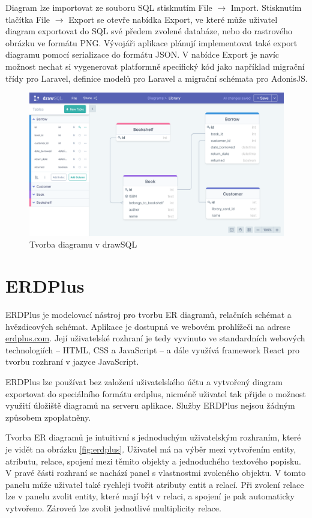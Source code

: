 Diagram lze importovat ze souboru SQL stisknutím File $\rightarrow$ Import.
Stisknutím tlačítka File $\rightarrow$ Export se otevře nabídka Export, ve které
může uživatel diagram exportovat do SQL své předem zvolené databáze, nebo do
rastrového obrázku ve formátu PNG. Vývojáři aplikace plánují implementovat také
export diagramu pomocí serializace do formátu JSON. V nabídce Export je navíc
možnost nechat si vygenerovat platformně specifický kód jako například migrační
třídy pro Laravel, definice modelů pro Laravel a migrační schémata pro AdonisJS.

\begin{figure}
  \centering
  \includegraphics[width=\textwidth]{../img/drawsql.png}
  \caption{Tvorba diagramu v drawSQL}
  \label{fig:drawsql}
\end{figure}

\section{ERDPlus}

ERDPlus je modelovací nástroj pro tvorbu ER diagramů, relačních schémat a
hvězdicových schémat. Aplikace je dostupná ve webovém prohlížeči na adrese
\url{erdplus.com}. Její uživatelské rozhraní je tedy vyvinuto ve standardních
webových technologiích -- HTML, CSS a JavaScript -- a dále využívá framework
React pro tvorbu rozhraní v jazyce JavaScript.

ERDPlus lze používat bez založení uživatelského účtu a vytvořený diagram
exportovat do speciálního formátu erdplus, nicméně uživatel tak přijde o možnost
využití úložiště diagramů na serveru aplikace. Služby ERDPlus nejsou žádným
způsobem zpoplatněny.

Tvorba ER diagramů je intuitivní s jednoduchým uživatelským rozhraním, které je
vidět na obrázku \ref{fig:erdplus}. Uživatel má na výběr mezi vytvořením entity,
atributu, relace, spojení mezi těmito objekty a jednoduchého textového popisku.
V pravé části rozhraní se nachází panel s vlastnostmi zvoleného objektu. V tomto
panelu může uživatel také rychleji tvořit atributy entit a relací. Při zvolení
relace lze v panelu zvolit entity, které mají být v relaci, a spojení je pak
automaticky vytvořeno. Zároveň lze zvolit jednotlivé multiplicity relace.

